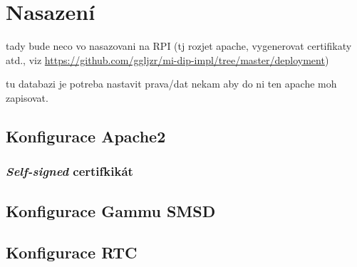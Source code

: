 \chapter{Nasazení}
\label{sec:dp}

tady bude neco vo nasazovani na RPI (tj rozjet apache, vygenerovat certifikaty atd., viz \url{https://github.com/ggljzr/mi-dip-impl/tree/master/deployment})

tu databazi je potreba nastavit prava/dat nekam aby do ni ten apache moh zapisovat.



\section{Konfigurace Apache2}

\subsection{\textit{Self-signed} certifkikát}

\section{Konfigurace Gammu SMSD}

\section{Konfigurace RTC}